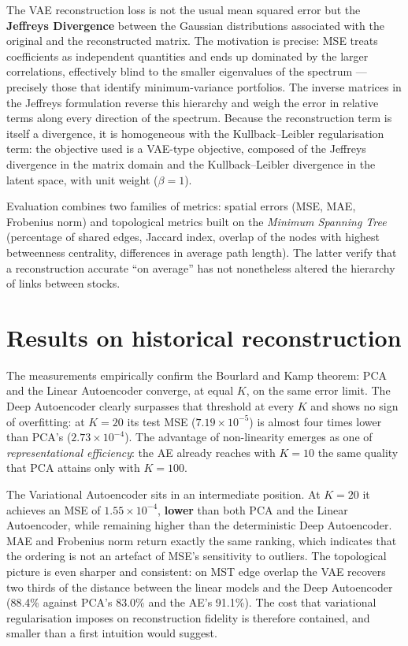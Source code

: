 \documentclass[11pt,a4paper]{article}
\begin{document}
The VAE reconstruction loss is not the usual mean squared error but the
\textbf{Jeffreys Divergence} between the Gaussian distributions associated
with the original and the reconstructed matrix. The motivation is precise: MSE
treats coefficients as independent quantities and ends up dominated by the
larger correlations, effectively blind to the smaller eigenvalues of the
spectrum --- precisely those that identify minimum-variance portfolios. The
inverse matrices in the Jeffreys formulation reverse this hierarchy and weigh
the error in relative terms along every direction of the spectrum. Because the
reconstruction term is itself a divergence, it is homogeneous with the
Kullback--Leibler regularisation term: the objective used is a VAE-type
objective, composed of the Jeffreys divergence in the matrix domain and the
Kullback--Leibler divergence in the latent space, with unit weight
($\beta = 1$).

Evaluation combines two families of metrics: spatial errors (MSE, MAE,
Frobenius norm) and topological metrics built on the \emph{Minimum Spanning
Tree} (percentage of shared edges, Jaccard index, overlap of the nodes with
highest betweenness centrality, differences in average path length). The
latter verify that a reconstruction accurate ``on average'' has not nonetheless
altered the hierarchy of links between stocks.

\section{Results on historical reconstruction}

The measurements empirically confirm the Bourlard and Kamp theorem: PCA and the
Linear Autoencoder converge, at equal $K$, on the same error limit. The Deep
Autoencoder clearly surpasses that threshold at every $K$ and shows no sign of
overfitting: at $K = 20$ its test MSE ($7.19 \times 10^{-5}$) is almost four
times lower than PCA's ($2.73 \times 10^{-4}$). The advantage of non-linearity
emerges as one of \emph{representational efficiency}: the AE already reaches
with $K = 10$ the same quality that PCA attains only with $K = 100$.

The Variational Autoencoder sits in an intermediate position. At $K = 20$ it
achieves an MSE of $1.55 \times 10^{-4}$, \textbf{lower} than both PCA and the
Linear Autoencoder, while remaining higher than the deterministic Deep
Autoencoder. MAE and Frobenius norm return exactly the same ranking, which
indicates that the ordering is not an artefact of MSE's sensitivity to outliers.
The topological picture is even sharper and consistent: on MST edge overlap
the VAE recovers two thirds of the distance between the linear models and the
Deep Autoencoder (88.4\% against PCA's 83.0\% and the AE's 91.1\%). The cost
that variational regularisation imposes on reconstruction fidelity is
therefore contained, and smaller than a first intuition would suggest.
\end{document}
